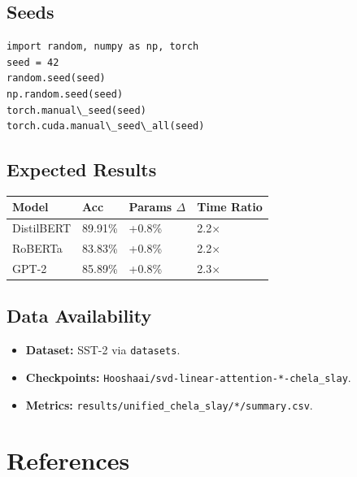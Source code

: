 \subsection{Seeds}

\begin{lstlisting}
import random, numpy as np, torch
seed = 42
random.seed(seed)
np.random.seed(seed)
torch.manual\_seed(seed)
torch.cuda.manual\_seed\_all(seed)
\end{lstlisting}

\subsection{Expected Results}

\begin{table}[H]
\centering
\small
\begin{tabular}{llll}
\toprule
\textbf{Model} & \textbf{Acc} & \textbf{Params $\Delta$} & \textbf{Time Ratio} \\
\midrule
DistilBERT & 89.91\% & +0.8\% & 2.2$\times$ \\
RoBERTa & 83.83\% & +0.8\% & 2.2$\times$ \\
GPT-2 & 85.89\% & +0.8\% & 2.3$\times$ \\
\bottomrule
\end{tabular}
\end{table}

\subsection{Data Availability}

\begin{itemize}
\item \textbf{Dataset:} SST-2 via \texttt{datasets}.
\item \textbf{Checkpoints:} \texttt{Hooshaai/svd-linear-attention-*-chela\_slay}.
\item \textbf{Metrics:} \texttt{results/unified\_chela\_slay/*/summary.csv}.

\end{itemize}


\section{References}

